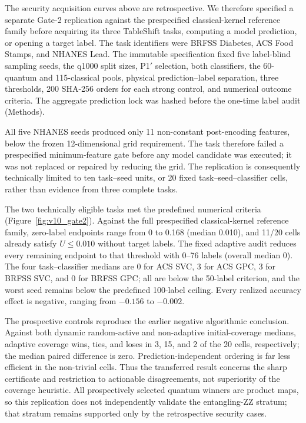 \documentclass[referee,lineno,pdflatex,sn-nature]{sn-jnl}
\theoremstyle{thmstyleone}%
\theoremstyle{thmstyletwo}%
\theoremstyle{thmstylethree}%
\begin{document}
The security acquisition curves above are retrospective. We therefore specified a separate Gate-2 replication against the prespecified classical-kernel reference family before acquiring its three TableShift tasks, computing a model prediction, or opening a target label. The task identifiers were BRFSS Diabetes, ACS Food Stamps, and NHANES Lead. The immutable specification fixed five label-blind sampling seeds, the q1000 split sizes, P1$'$ selection, both classifiers, the 60-quantum and 115-classical pools, physical prediction--label separation, three thresholds, 200 SHA-256 orders for each strong control, and numerical outcome criteria. The aggregate prediction lock was hashed before the one-time label audit (Methods).

All five NHANES seeds produced only 11 non-constant post-encoding features, below the frozen 12-dimensional grid requirement. The task therefore failed a prespecified minimum-feature gate before any model candidate was executed; it was not replaced or repaired by reducing the grid. The replication is consequently technically limited to ten task--seed units, or 20 fixed task--seed--classifier cells, rather than evidence from three complete tasks.

The two technically eligible tasks met the predefined numerical criteria (Figure~\ref{fig:v10_gate2}). Against the full prespecified classical-kernel reference family, zero-label endpoints range from 0 to 0.168 (median 0.010), and 11/20 cells already satisfy $U\leq0.010$ without target labels. The fixed adaptive audit reduces every remaining endpoint to that threshold with 0--76 labels (overall median 0). The four task--classifier medians are 0 for ACS SVC, 3 for ACS GPC, 3 for BRFSS SVC, and 0 for BRFSS GPC; all are below the 50-label criterion, and the worst seed remains below the predefined 100-label ceiling. Every realized accuracy effect is negative, ranging from $-0.156$ to $-0.002$.

The prospective controls reproduce the earlier negative algorithmic conclusion. Against both dynamic random-active and non-adaptive initial-coverage medians, adaptive coverage wins, ties, and loses in 3, 15, and 2 of the 20 cells, respectively; the median paired difference is zero. Prediction-independent ordering is far less efficient in the non-trivial cells. Thus the transferred result concerns the sharp certificate and restriction to actionable disagreements, not superiority of the coverage heuristic. All prospectively selected quantum winners are product maps, so this replication does not independently validate the entangling-ZZ stratum; that stratum remains supported only by the retrospective security cases.
\end{document}
